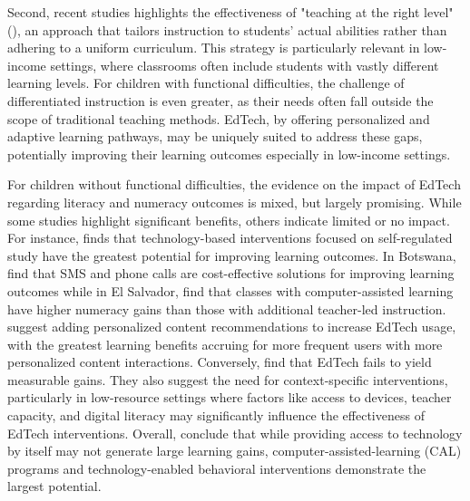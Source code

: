 \documentclass[hidelinks,12pt]{article}
\begin{document}
\begin{singlespace}
Second, recent studies highlights the effectiveness of "teaching at the right level" (\cite{banergee_mainstreaming_2016}), an approach that tailors instruction to students’ actual abilities rather than adhering to a uniform curriculum. This strategy is particularly relevant in low-income settings, where classrooms often include students with vastly different learning levels. For children with functional difficulties, the challenge of differentiated instruction is even greater, as their needs often fall outside the scope of traditional teaching methods. EdTech, by offering personalized and adaptive learning pathways, may be uniquely suited to address these gaps, potentially improving their learning outcomes especially in low-income settings.  

For children without functional difficulties, the evidence on the impact of EdTech regarding literacy and numeracy outcomes is mixed, but largely promising. While some studies highlight significant benefits, others indicate limited or no impact. For instance, \textcite{rodriguez-segura_edtech_2022} finds that technology-based interventions focused on self-regulated study have the greatest potential for improving learning outcomes. In Botswana, \textcite{angrist_experimental_2022} find that SMS and phone calls are cost-effective solutions for improving learning outcomes while in El Salvador, \textcite{buchel_relative_2022} find that classes with computer-assisted learning have higher numeracy gains than those with additional teacher-led instruction. \textcite{agrawal_personalized_2022} suggest adding personalized content recommendations to increase EdTech usage, with the greatest learning benefits accruing for more frequent users with more personalized content interactions. Conversely, \textcite{piper_does_2016} find that EdTech fails to yield measurable gains. They also suggest the need for context-specific interventions, particularly in low-resource settings where factors like access to devices, teacher capacity, and digital literacy may significantly influence the effectiveness of EdTech interventions. Overall, \textcite{escueta_upgrading_2020} conclude that while providing access to technology by itself may not generate large learning gains, computer-assisted-learning (CAL) programs and technology-enabled behavioral interventions demonstrate the largest potential.


\end{singlespace}
\end{document}
